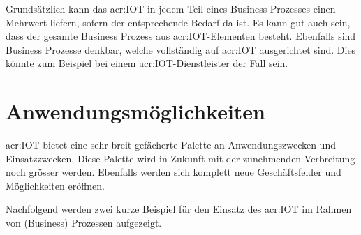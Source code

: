 Grundsätzlich kann das \gls{acr:IOT} in jedem Teil eines Business Prozesses einen Mehrwert liefern, sofern der entsprechende Bedarf da ist. Es kann gut auch sein, dass der gesamte Business Prozess aus \gls{acr:IOT}-Elementen besteht. Ebenfalls sind Business Prozesse denkbar, welche vollständig auf \gls{acr:IOT} ausgerichtet sind. Dies könnte zum Beispiel bei einem \gls{acr:IOT}-Dienstleister der Fall sein.


\section{Anwendungsmöglichkeiten}
\gls{acr:IOT} bietet eine sehr breit gefächerte Palette an Anwendungszwecken und Einsatzzwecken. Diese Palette wird in Zukunft mit der zunehmenden Verbreitung noch grösser werden. Ebenfalls werden sich komplett neue Geschäftsfelder und Möglichkeiten eröffnen.

Nachfolgend werden zwei kurze Beispiel für den Einsatz des \gls{acr:IOT} im Rahmen von (Business) Prozessen aufgezeigt.


